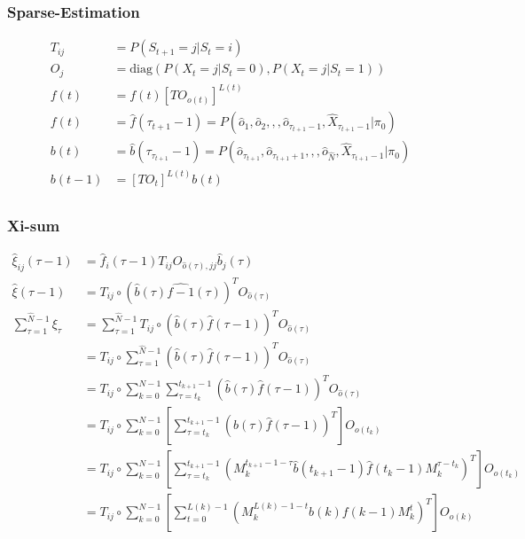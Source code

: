\documentclass{article}
\begin{document}
\subsubsection{Sparse-Estimation}
  \begin{align*}
    T_{ij} &= P(S_{t+1}=j |S_t=i)\\
    O_j &= \text{diag}(P(X_t=j | S_t=0), P(X_t=j | S_t=1))\\
    f(t) &= f(t)\left[TO_{o(t)}\right]^{L(t)}\\
    f(t) &= \hat{f}(\tau_{t+1}-1)= P(\hat{o}_1,\hat{o}_2,,,\hat{o}_{\tau_{t+1}-1},\hat{X}_{\tau_{t+1}-1}|\pi_0)\\
    b(t) &= \hat{b}(\tau_{\tau_{t+1}}-1) = P(\hat{o}_{\tau_{t+1}},\hat{o}_{\tau_{t+1}+1},,,\hat{o}_{\hat{N}},\hat{X}_{\tau_{t+1}-1}|\pi_0)\\
    b(t-1) &= \left[TO_t\right]^{L(t)}b(t)\\
  \end{align*}
  
  \subsubsection{Xi-sum}
  \begin{align*}
    \hat{\xi}_{ij}(\tau-1) &= \hat{f}_{i}(\tau-1)T_{ij}O_{\hat{o}(\tau), jj}\hat{b}_j(\tau)\\
    \hat{\xi}(\tau-1) &= T_{ij} \circ (\hat{b}(\tau)\hat{f-1}(\tau))^TO_{\hat{o}(\tau)}\\
    \sum_{\tau=1}^{\hat{N}-1} \xi_\tau &= \sum_{\tau=1}^{\hat{N}-1} T_{ij} \circ (\hat{b}(\tau)\hat{f}(\tau-1))^TO_{\hat{o}(\tau)}\\
    &= T_{ij} \circ \sum_{\tau=1}^{\hat{N}-1} (\hat{b}(\tau)\hat{f}(\tau-1))^TO_{\hat{o}(\tau)}\\
    &= T_{ij} \circ \sum_{k=0}^{N-1} \sum_{\tau=t_k}^{t_{k+1}-1} (\hat{b}(\tau)\hat{f}(\tau-1))^TO_{\hat{o}(\tau)}\\
    &= T_{ij} \circ \sum_{k=0}^{N-1} \left[\sum_{\tau=t_k}^{t_{k+1}-1} (\hat{b}(\tau)\hat{f}(\tau-1))^T\right]O_{o(t_k)}\\
    &= T_{ij} \circ \sum_{k=0}^{N-1} \left[\sum_{\tau=t_k}^{t_{k+1}-1} (M_{k}^{t_{k+1}-1-\tau}\hat{b}(t_{k+1}-1)\hat{f}(t_k-1)M_k^{\tau-t_k})^T\right]O_{o(t_k)}\\
    &= T_{ij} \circ \sum_{k=0}^{N-1} \left[\sum_{t=0}^{L(k)-1} (M_{k}^{L(k)-1-t}b(k)f(k-1)M_k^{t})^T\right]O_{o(k)}\\
  \end{align*}
\end{document}

